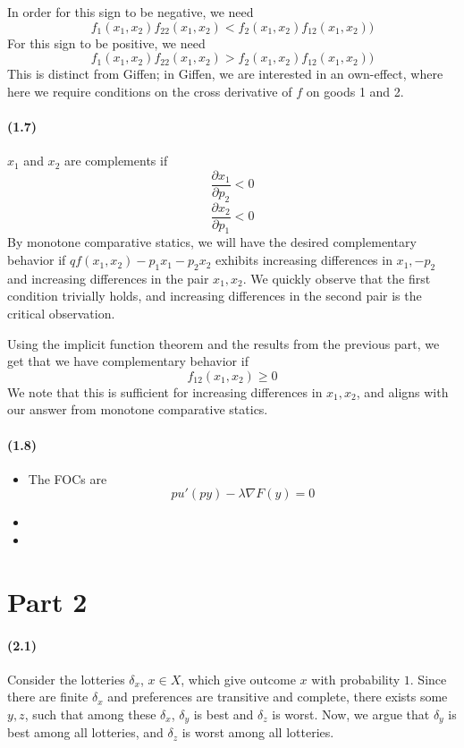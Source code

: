 \documentclass[10pt,letter]{article}
\begin{document}
In order for this sign to be negative, we need
\[ f_1(x_1, x_2)f_{22}(x_1, x_2) < f_2(x_1, x_2)f_{12}(x_1, x_2)) \]
For this sign to be positive, we need
\[ f_1(x_1, x_2)f_{22}(x_1, x_2) > f_2(x_1, x_2)f_{12}(x_1, x_2)) \]
This is distinct from Giffen; in Giffen, we are interested in an own-effect, where here we require conditions on the cross derivative of $f$ on goods 1 and 2.
\paragraph{(1.7)}
$x_1$ and $x_2$ are complements if
\[ \frac{\partial x_1}{\partial p_2} < 0 \]
\[ \frac{\partial x_2}{\partial p_1} < 0 \]
By monotone comparative statics, we will have the desired complementary behavior if $qf(x_1, x_2) - p_1 x_1 - p_2 x_2$ exhibits increasing differences in $x_1, -p_2$ and increasing differences in the pair $x_1, x_2$. We quickly observe that the first condition trivially holds, and increasing differences in the second pair is the critical observation.

Using the implicit function theorem and the results from the previous part, we get that we have complementary behavior if
\[ f_{12}(x_1, x_2) \ge  0 \]
We note that this is sufficient for increasing differences in $x_1, x_2$, and aligns with our answer from monotone comparative statics.


\paragraph{(1.8)}
\begin{itemize}
\item The FOCs are
\[ p u'(py)- \lambda \nabla F(y) = 0  \]

\item
\item
\end{itemize}
\pagebreak
\section*{Part 2}
\paragraph{(2.1)}
Consider the lotteries $\delta_x$, $x \in X$, which give outcome $x$ with probability $1$. Since there are finite $\delta_x$ and preferences are transitive and complete, there exists some $y,z$, such that among these $\delta_x$, $\delta_y$ is best and $\delta_z$ is worst. Now, we argue that $\delta_y$ is best among all lotteries, and $\delta_z$ is worst among all lotteries.
\end{document}

